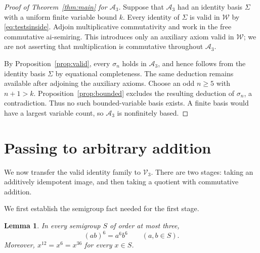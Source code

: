 \documentclass[11pt,reqno]{amsart}
\numberwithin{equation}{section}
\newtheorem{lemma}[theorem]{Lemma}
\theoremstyle{definition}
\theoremstyle{remark}
\newcommand{\Vthree}{\mathcal V_3}
\newcommand{\Athree}{\mathcal A_3}
\newcommand{\W}{\mathcal W}
\begin{document}
\begin{proof}[Proof of Theorem~\ref{thm:main} for $\Athree$]
Suppose that $\Athree$ had an identity basis $\Sigma$
with a uniform finite variable bound $k$. Every identity
of $\Sigma$ is valid in $\W$ by \eqref{eq:testsinside}.
Adjoin multiplicative commutativity and work in the free
commutative ai-semiring. This introduces only an auxiliary
axiom valid in $\W$; we are not asserting that multiplication
is commutative throughout $\Athree$.

By Proposition~\ref{prop:valid}, every $\sigma_n$ holds
in $\Athree$, and hence follows from the identity basis
$\Sigma$ by equational completeness. The same deduction
remains available after adjoining the auxiliary axioms.
Choose an odd $n\geq5$ with $n+1>k$.
Proposition~\ref{prop:bounded} excludes the resulting
deduction of $\sigma_n$, a contradiction. Thus no such
bounded-variable basis exists. A finite basis would have
a largest variable count, so $\Athree$ is nonfinitely based.
\end{proof}

\section{Passing to arbitrary addition}
\label{sec:arbitrary}

We now transfer the valid identity family to $\Vthree$.
There are two stages: taking an additively idempotent
image, and then taking a quotient with commutative
addition.

We first establish the semigroup fact needed for the first stage.

\begin{lemma}\label{lem:sixth-power}
In every semigroup $S$ of order at most three,
\begin{equation}\label{eq:power}
(ab)^6=a^6b^6\qquad(a,b\in S).
\end{equation}
Moreover, $x^{12}=x^6=x^{36}$ for every $x\in S$.
\end{lemma}
\end{document}
